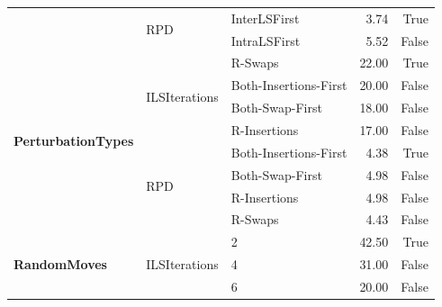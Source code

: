 \begin{table}[!ht]
\begin{tabular}{l l l r r}
		                                               & \multirow[t]{2}{*}{RPD}           & InterLSFirst          & 3.74            & True            \\\cmidrule(lr){3-5}
		                                               &                                   & IntraLSFirst          & 5.52            & False           \\\midrule
		\multirow[t]{8}{*}{\textbf{PerturbationTypes}} & \multirow[t]{4}{*}{ILSIterations} & R-Swaps               & 22.00           & True            \\\cmidrule(lr){3-5}
		                                               &                                   & Both-Insertions-First & 20.00           & False           \\\cmidrule(lr){3-5}
		                                               &                                   & Both-Swap-First       & 18.00           & False           \\\cmidrule(lr){3-5}
		                                               &                                   & R-Insertions          & 17.00           & False           \\\cmidrule(lr){2-5}
		                                               & \multirow[t]{4}{*}{RPD}           & Both-Insertions-First & 4.38            & True            \\\cmidrule(lr){3-5}
		                                               &                                   & Both-Swap-First       & 4.98            & False           \\\cmidrule(lr){3-5}
		                                               &                                   & R-Insertions          & 4.98            & False           \\\cmidrule(lr){3-5}
		                                               &                                   & R-Swaps               & 4.43            & False           \\\midrule
		\multirow[t]{10}{*}{\textbf{RandomMoves}}      & \multirow[t]{5}{*}{ILSIterations} & 2                     & 42.50           & True            \\\cmidrule(lr){3-5}
		                                               &                                   & 4                     & 31.00           & False           \\\cmidrule(lr){3-5}
		                                               &                                   & 6                     & 20.00           & False           \\\cmidrule(lr){3-5}

\end{tabular}
\end{table}
